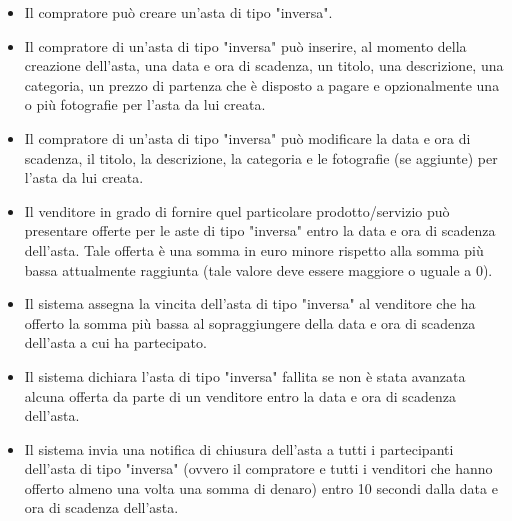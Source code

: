         \begin{itemize}            
            \item Il compratore può creare un'asta di tipo "inversa".
            \item Il compratore di un'asta di tipo "inversa" può inserire, al momento della creazione dell'asta, una data e ora di scadenza, un titolo, una descrizione, una categoria, un prezzo di partenza che è disposto a pagare e opzionalmente una o più fotografie per l'asta da lui creata.
            \item Il compratore di un'asta di tipo "inversa" può modificare la data e ora di scadenza, il titolo, la descrizione, la categoria e le fotografie (se aggiunte) per l'asta da lui creata.
            \item Il venditore in grado di fornire quel particolare prodotto/servizio può presentare offerte per le aste di tipo "inversa" entro la data e ora di scadenza dell'asta. Tale offerta è una somma in euro minore rispetto alla somma più bassa attualmente raggiunta (tale valore deve essere maggiore o uguale a 0).
            \item Il sistema assegna la vincita dell'asta di tipo "inversa" al venditore che ha offerto la somma più bassa al sopraggiungere della data e ora di scadenza dell'asta a cui ha partecipato.
            \item Il sistema dichiara l'asta di tipo "inversa" fallita se non è stata avanzata alcuna offerta da parte di un venditore entro la data e ora di scadenza dell'asta.
            \item Il sistema invia una notifica di chiusura dell'asta a tutti i partecipanti dell'asta di tipo "inversa" (ovvero il compratore e tutti i venditori che hanno offerto almeno una volta una somma di denaro) entro 10 secondi dalla data e ora di scadenza dell'asta.
        \end{itemize}